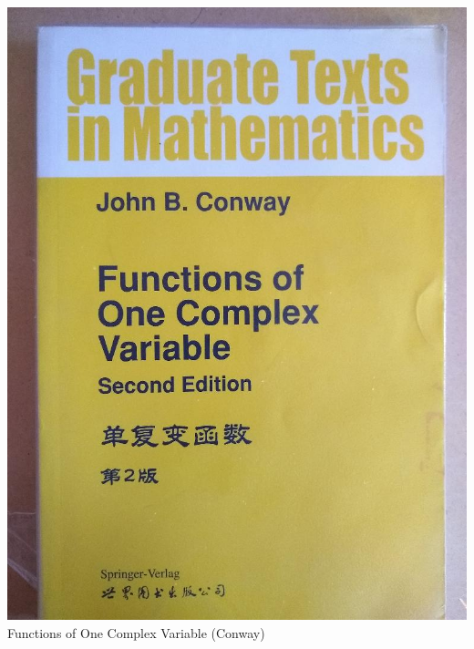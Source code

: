 \documentclass[t]{beamer}
\newcommand{\htarget}[2]{\hypertarget{#1}{#2}}
\begin{document}
\begin{frame}\htarget{CVC}{} \begin{center}
\includegraphics[height=0.8\textheight]{Functions_of_One_Complex_Variable_Conway_mini.jpg} \\
Functions of One Complex Variable (Conway)
\end{center} \end{frame}
\end{document}
